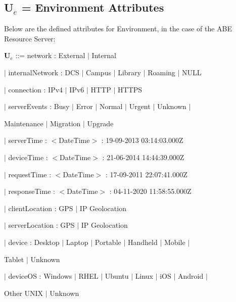 \documentclass[a4paper,11pt]{article}
\begin{document}
\subsection{U$_{e}$ = Environment Attributes}
Below are the defined attributes for Environment, in the case of the ABE Resource Server:\\\par
\textbf{U$_{e}$} ::= network : External $|$ Internal \par
\hspace{1.05cm}$|$ internalNetwork : DCS $|$ Campus $|$ Library $|$ Roaming $|$ NULL \par
\hspace{1.05cm}$|$ connection : IPv4 $|$ IPv6 $|$ HTTP $|$ HTTPS \par
\hspace{1.05cm}$|$ serverEvents : Busy $|$ Error $|$ Normal $|$ Urgent $|$ Unknown $|$ \par
\hspace{3.8cm}Maintenance $|$ Migration $|$ Upgrade \par
\hspace{1.05cm}$|$ serverTime : $<$DateTime$>$ : 19-09-2013 03:14:03.000Z \par
\hspace{1.05cm}$|$ deviceTime : $<$DateTime$>$ : 21-06-2014 14:44:39.000Z \par
\hspace{1.05cm}$|$ requestTime : $<$DateTime$>$ : 17-09-2011 22:07:41.000Z \par
\hspace{1.05cm}$|$ responseTime : $<$DateTime$>$ : 04-11-2020 11:58:55.000Z \par
\hspace{1.05cm}$|$ clientLocation : GPS $|$ IP Geolocation \par
\hspace{1.05cm}$|$ serverLocation : GPS $|$ IP Geolocation \par
\hspace{1.05cm}$|$ device : Desktop $|$ Laptop $|$ Portable $|$ Handheld $|$ Mobile $|$ \par
\hspace{2.74cm}Tablet $|$ Unknown \par
\hspace{1.05cm}$|$ deviceOS : Windows $|$ RHEL $|$ Ubuntu $|$ Linux $|$ iOS $|$ Android $|$ \par
\hspace{3.23cm}Other UNIX $|$ Unknown \par
\end{document}
